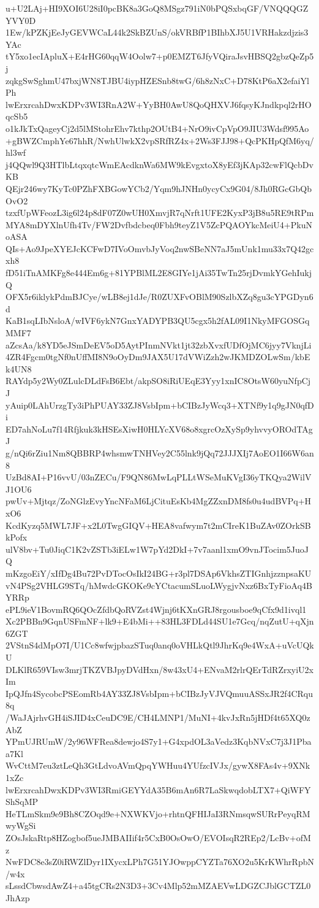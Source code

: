 u+U2LAj+HI9XOI6U28iI0pcBK8a3GoQ8MSgz791iN0bPQSxbqGF/VNQQQGZYVY0D
1Ew/kPZKjEeJyGEVWCaL44k2SkBZUnS/okVRBfP1BIhbXJ5U1VRHakzdjzis3YAc
tY5xo1ecIApluX+E4rHG60qqW4Oolw7+p0EMZT6JfyVQiraJsvHBSQ2gbzQeZp5j
zqkgSwSghmU47bxjWN8TJBU4iypHZESnb8twG/6h8zNxC+D78KtP6aX2efaiYlPh
lwErxrcahDwxKDPv3WI3RnA2W+YyBH0AwU8QoQHXVJ6fqsyKJndkpql2rHOqcSb5
o1kJkTxQageyCj2d5lMStohrEhv7kthp2OUtB4+NrO9ivCpVpO9JIU3Wdsf995Ao
+gBWZCmphYe67hhR/NwhUlwkX2vpSRfRZ4x+2Ws3FJJ98+QcPKHpQfM6yq/hl3wf
j4QQwl9Q3HTlbLtqxqtcWmEAcdknWa6MW9kEvgxtoX8yEf3jKAp32cwFlQcbDvKB
QEjr246wy7KyTc0PZhFXBGowYCb2/Yqm9hJNHn0ycyCx9G04/8Jh0RGcGbQbOvO2
tzxfUpWFeozL3ig6l24p8dF07Z0wUH0XmvjR7qNrft1UFE2KyxP3jB8u5RE9tRPm
MYA8mDYXlnUfh4Tv/FW2Dvfbdcbeq0Fbh9teyZ1V5ZcPQAOYkcMeiU4+PkuNoASA
QIs+Ao9JpeXYEJcKCFwD7IVoOmvbJyVoq2nwSBeNN7aJ5mUnk1mu33x7Q42gcxh8
fD51iTnAMKFg8e444Em6g+81YPBlML2E8GIYe1jAi35TwTn25rjDvmkYGehIukjQ
OFX5r6iklykPdmBJCye/wLB8ej1dJe/R0ZUXFvOBlM90SzlbXZq8gu3cYPGDyn6d
KaB1sqLIbNsloA/wIVF6ykN7GnxYADYPB3QU5cgx5h2fAL09I1NkyMFGOSGqMMF7
aZcsAa/k8YD5eJSmDeEV5oD5AytPInmNVkt1jt32zbXvxfUDfOjMC6jyy7VknjLi
4ZR4Fgcm0tgNf0nUffMI8N9oOyDm9JAX5U17dVWiZzh2wJKMDZOLwSm/kbEk4UN8
RAYdp5y2Wy0ZLulcDLdFsB6Ebt/akpSO8iRiUEqE3Yyy1xnIC8OtsW60yuNfpCjJ
yAuip0LAhUrzgTy3iPhPUAY33ZJ8VsbIpm+bCIBzJyWcq3+XTNf9y1q9gJN0qfDi
ED7ahNoLu7f14Rfjkuk3kHSEsXiwH0HLYcXV68o8xgrcOzXySp9yhvvyOROdTAgJ
g/nQi6rZiu1Nm8QBBRP4whsmwTNHVey2C55lnk9jQq72JJJXIj7AoEO1I66W6an8
UzBd8AI+P16vvU/03nZECu/F9QN86MwLqPLLtWSeMuKVgI36yTKQya2WilVJ1OU6
pwUv+Mjtqz/ZoNGlzEvyYncNFaM6LjCituEsKb4MgZZxnDM8fs0u4udBVPq+HxO6
KcdKyzq5MWL7JF+x2L0TwgGIQV+HEA8vafwym7t2mCIreK1BuZAv0ZOrkSBkPofx
ulV8bv+Tu0JiqC1K2vZSTb3iELw1W7pYd2DkI+7v7aanl1xmO9vnJTocim5JuoJQ
mKzgoEiY/xIfDg4Bu72PvDTocOsIkI24BG+r3pl7DSAp6VkhsZTIGnhjzznpsaKU
vN4PSg2VHLG9STq/hMwdcGKOKe9cYCtacumSLuoLWygjvNxz6BxTyFioAq4BYRRp
ePL9ieV1BovmRQ6QOcZfdbQoRVZst4Wjnj6tKXnGRJ8rgousboe9qCfx9d1ivql1
Xc2PBBn9GqnUSFmNF+lk9+E4bMi++83HL3FDLd44SU1e7Gcq/nqZutU+qXjn6ZGT
2VStnS4dMpO7I/U1Cc8wfwjpbazSTuq0anq0oVHLkQtl9JhrKq9e4WxA+uVcUQkU
DLKlR659VIsw3mrjTKZVBJpyDVdHxn/8w43xU4+ENvaM2rlrQErTdRZrxyiU2xIm
IpQJfn4SycobcPSEomRb4AY33ZJ8VsbIpm+bCIBzJyVJVQmuuASSxJR2f4CRqu8q
/WaJAjrhvGH4iSJID4xCeuDC9E/CH4LMNP1/MuNI+4kvJxRn5jHDf4t65XQ0zAbZ
YPmUJRUmW/2y96WFRea8dewjo4S7y1+G4xpdOL3aVedz3KqbNVxC7j3J1Pbaa7Kl
WvCttM7eu3ztLeQh3GtLdvoAVmQpqYWHuu4YUfzcIVJx/gywX8FAs4v+9XNk1xZc
lwErxrcahDwxKDPv3WI3RmiGEYYdA35B6mAn6R7LaSkwqdobLTX7+QiWFYShSqMP
HeTLmSkm9e9Bh8CZOqd9e+NXWKVjo+rhtnQFHIJaI3RNmsqwSURrPeyqRMwyWgSi
ZOsJskaRtp8HZogbof5ueJMBAIIif4r5CxB0OsOwO/EVOIsqR2REp2/LcBv+ofMz
NwFDC8e3sZ0iRWZlDyr1IXycxLPh7G51YJOwppCYZTa76XO2u5KrKWhrRpbN/w4x
sLssdCbwsdAwZ4+a45tgCRs2N3D3+3Cv4Mlp52mMZAEVwLDGZCJblGCTZL0JhAzp
